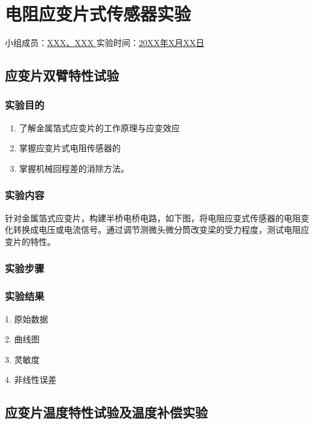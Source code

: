 \section{电阻应变片式传感器实验}

\begin{center}
    {
        小组成员：\underline{\quad XXX、XXX \quad} \quad
        实验时间：\underline{\quad 20XX年X月XX日 \quad}
    }
\end{center}

\subsection{应变片双臂特性试验}

\subsubsection{实验目的}

\begin{enumerate}
    \item 了解金属箔式应变片的工作原理与应变效应
    \item 掌握应变片式电阻传感器的
    \item 掌握机械回程差的消除方法。
\end{enumerate}

\subsubsection{实验内容}

针对金属箔式应变片，构建半桥电桥电路，如下图，将电阻应变式传感器的电阻变化转换成电压或电流信号。通过调节测微头微分筒改变梁的受力程度，测试电阻应变片的特性。

\subsubsection{实验步骤}

\subsubsection{实验结果}

1. 原始数据

2. 曲线图

3. 灵敏度

4. 非线性误差

\subsection{应变片温度特性试验及温度补偿实验}

